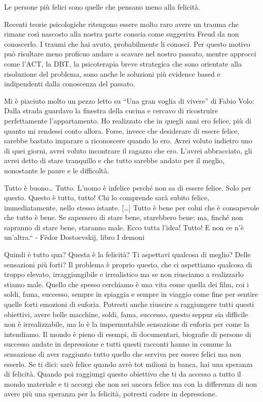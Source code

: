 \documentclass[12pt]{book} %
\begin{document}
Le persone più felici sono quelle che pensano meno alla felicità.

Recenti teorie psicologiche ritengono essere molto raro avere un trauma che rimane così nascosto alla nostra parte conscia come
suggeriva Freud da non conoscerlo. I traumi che hai avuto, probabilmente li conosci. Per questo motivo può risultare
meno proficuo andare a scavare nel nostro passato, mentre approcci come l'ACT, la DBT, la psicoterapia breve strategica
che sono orientate alla risoluzione del problema, sono anche le soluzioni più evidence based e indipendenti dalla
conoscenza del passato.

Mi è piaciuto molto un pezzo letto su “Una gran voglia di vivere” di
Fabio Volo: Dalla strada guardavo la finestra della cucina e cercavo di ricostruire perfettamente
l'appartamento. Ho realizzato che in quegli anni ero felice, più di quanto mi rendessi conto
allora. Forse, invece che desiderare di essere felice, sarebbe bastato imparare a riconoscere quando lo ero. Avrei
voluto indietro uno di quei giorni, avrei voluto incontrare il ragazzo che ero. L'avrei
abbracciato, gli avrei detto di stare tranquillo e che tutto sarebbe andato per il meglio, nonostante le paure e le
difficoltà. 

Tutto è buono… Tutto. L'uomo è infelice perché non sa di essere felice. Solo per questo. Questo è tutto, tutto! Chi lo
comprende sarà subito felice, immediatamente, nello stesso istante. […] Tutto è bene per colui che è consapevole che
tutto è bene. Se sapessero di stare bene, starebbero bene; ma, finché non sapranno di stare bene, staranno male. Ecco
tutta l'idea! Tutto! E non ce n'è un'altra.“ - Fëdor Dostoevskij, libro I demoni

Quindi è tutto qua? Questa è la felicità? Ti aspettavi qualcosa di meglio? Delle sensazioni più forti? Il problema è
proprio questo, che ci aspettiamo qualcosa di troppo elevato, irraggiungibile e irrealistico ma se non riusciamo a
realizzarlo stiamo male. Quello che spesso cerchiamo è una vita come quella dei film, coi i soldi, fama, successo,
sempre in spiaggia e sempre in viaggio come fine per sentire quelle forti emozioni di euforia. Potresti anche riuscire
a raggiungere tutti questi obiettivi, avere belle macchine, soldi, fama, successo, questo seppur sia difficile non è
irrealizzabile, ma lo è la impermutabile sensazione di euforia per come la intendiamo. Il mondo è pieno di esempi, di
documentari, biografie di persone di successo andate in depressione e tutti questi racconti hanno in comune la
sensazione di aver raggiunto tutto quello che serviva per essere felici ma non esserlo. Se ti dici: sarò felice quando
avrò tot milioni in banca, hai una speranza di felicità. Quando poi raggiungi questo obiettivo che ti da accesso a
tutto il mondo materiale e ti accorgi che non sei ancora felice ma con la differenza di non avere più una speranza per
la felicità, potresti cadere in depressione.
\end{document}
